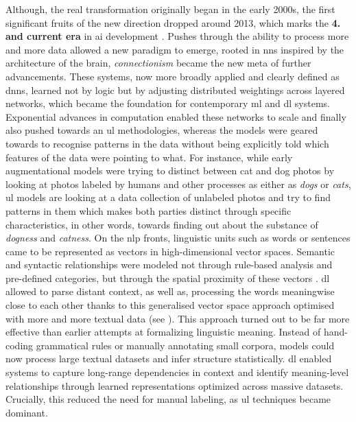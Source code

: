 
Although, the real transformation originally began in the early 2000s, the first significant fruits of the new direction dropped around 2013, which marks the \textbf{4. and current era} in \gls{ai} development \parencite[129]{manning2022a}. Pushes through the ability to process more and more data allowed a new paradigm to emerge, rooted in \glspl{nn} inspired by the architecture of the brain, \emph{connectionism} became the new meta of further advancements. These systems, now more broadly applied and clearly defined as \glspl{dnn}, learned not by logic but by adjusting distributed weightings across layered networks, which became the foundation for contemporary \gls{ml} and \gls{dl} systems. Exponential advances in computation enabled these networks to scale \parencite[184]{eloff2021} and finally also pushed towards an \gls{ul}  methodologies, whereas the models were geared towards to recognise patterns in the data without being explicitly told which features of the data were pointing to what. For instance, while early augmentational models were trying to distinct between cat and dog photos by looking at photos labeled by humans and other processes as either as \textit{dogs} or \textit{cats}, \gls{ul} models are looking at a data collection of unlabeled photos and try to find patterns in them which makes both parties distinct through specific characteristics, in other words, towards finding out about the substance of \textit{dogness} and \textit{catness}. On the \gls{nlp} fronts, linguistic units such as words or sentences came to be represented as vectors in high-dimensional vector spaces. Semantic and syntactic relationships were modeled not through rule-based analysis and pre-defined categories, but through the spatial proximity of these vectors \parencite[129]{manning2022a}. \Gls{dl} allowed to parse distant context, as well as, processing the words meaningwise close to each other thanks to this generalised vector space approach optimised with more and more textual data (see \cite[129]{manning2022a}). This approach turned out to be far more effective than earlier attempts at formalizing linguistic meaning. Instead of hand-coding grammatical rules or manually annotating small corpora, models could now process large textual datasets and infer structure statistically. \Gls{dl} enabled systems to capture long-range dependencies in context and identify meaning-level relationships through learned representations optimized across massive datasets. Crucially, this reduced the need for manual labeling, as \gls{ul} techniques became dominant.

